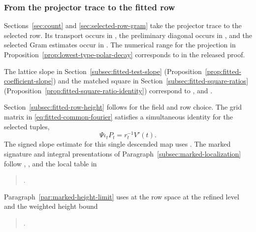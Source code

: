 \subsubsection{From the projector trace to the fitted row}
Sections~\ref{sec:count} and \ref{sec:selected-row-gram}
take the projector trace to the selected row. Its transport occurs in
, the preliminary diagonal occurs in , and the selected Gram estimates occur in
. The numerical range for the
projection in Proposition~\ref{prop:lowest-type-polar-decay}
corresponds to  in the released proof.
\cite{release-selected-row-gram}

The lattice slope in Section~\ref{subsec:fitted-test-slope}
(Proposition~\ref{prop:fitted-coefficient-slope}) and the matched square
in Section~\ref{subsec:fitted-square-ratios}
(Proposition~\ref{prop:fitted-square-ratio-identity}) correspond to ,
 and .
\cite{release-fitted-test-slope,release-fitted-square,release-fitted-square-height}

Section~\ref{subsec:fitted-row-height} follows
 for the field and row choice.
The grid matrix in \eqref{eq:fitted-common-fourier} satisfies
a simultaneous identity for the selected tuples,
\[
 \Psi\iota_t P_t=r_t^{-1}V'(t).
\]
The signed slope estimate for this single descended map uses
.
\cite{release-fitted-row-grid,release-fitted-row-height}
The marked signature and integral presentations of
Paragraph~\ref{subsec:marked-localization} follow
, ,
 and the local table in
\begin{quote}
.
\end{quote}
Paragraph~\ref{par:marked-height-limit} uses 
at the row space at the refined level and the weighted height bound
\begin{quote}
.
\end{quote}
\cite{release-marked-family,release-marked-rows,release-marked-sharp,release-frame-height}

